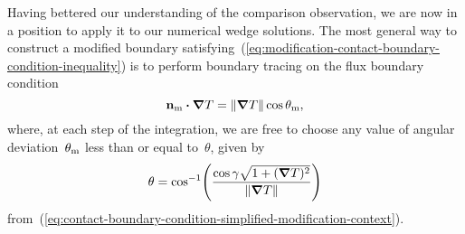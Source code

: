 Having bettered our understanding of the comparison observation,
we are now in a position to apply it to our numerical wedge solutions.
The most general way to construct a modified boundary
satisfying~(\ref{eq:modification-contact-boundary-condition-inequality})
is to perform boundary tracing
on the flux boundary condition
\begin{equation}
  \mathop{}\!\boldsymbol{\mathbf{n}}_{\mathrm{m}} \boldsymbol{\cdot} \mathop{}\!\boldsymbol{\mathbf{\nabla}} T = \lVert\mathop{}\!\boldsymbol{\mathbf{\nabla}} T\rVert \cos\theta_{\mathrm{m}},
  \label{eq:modification-boundary-condition}
\end{equation}
where, at each step of the integration,
we are free to choose any value of angular deviation~$\theta_{\mathrm{m}}$
less than or equal to~$\theta$,
given by
\begin{equation}
  \theta =
    \cos^{-1} \roundbr*{
      \frac{\cos\gamma \sqrt{1 + (\del T)^2}}{\norm{\del T}}
    }
  \label{eq:contact-boundary-condition-deviation}
\end{equation}
from~(\ref{eq:contact-boundary-condition-simplified-modification-context}).

